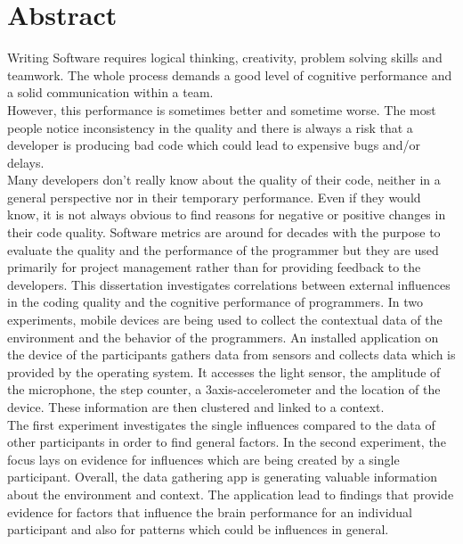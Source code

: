 \section*{Abstract}

Writing Software requires logical thinking, creativity, problem solving skills and teamwork. The whole process demands a good level of cognitive performance and a solid communication within a team.\\
However, this performance is sometimes better and sometime worse. The most people notice inconsistency in the quality and there is always a risk that a developer is producing bad code which could lead to expensive bugs and/or delays.\\
Many developers don't really know about the quality of their code, neither in a general perspective nor in their temporary performance. Even if they would know, it is not always obvious to find reasons for negative or positive changes in their code quality.
Software metrics are around for decades with the purpose to evaluate the quality and the performance of the programmer but they are used primarily for project management rather than for providing feedback to the developers. 
\bigbreak
This dissertation investigates correlations between external influences in the coding quality and the cognitive performance of programmers. 
In two experiments, mobile devices are being used to collect the contextual data of the environment and the behavior of the programmers. 
An installed application on the device of the participants gathers data from sensors and collects data which is provided by the operating system. It accesses the light sensor, the amplitude of the microphone, the step counter, a 3axis-accelerometer and the location of the device. These information are then clustered and linked to a context.\\
The first experiment investigates the single influences compared to the data of other participants in order to find general factors. In the second experiment, the focus lays on evidence for influences which are being created by a single participant. 
\bigbreak
Overall, the data gathering app is generating valuable information about the environment and context. 
The application lead to findings that provide evidence for factors that influence the brain performance for an individual participant and also for patterns which could be influences in general. 

